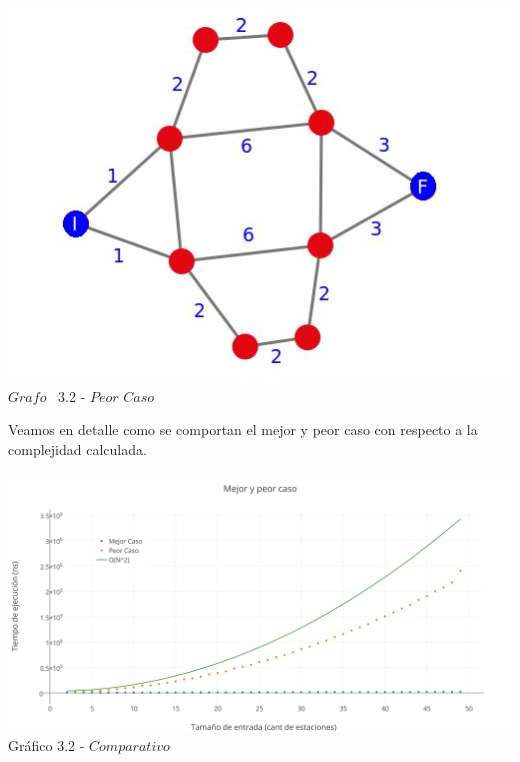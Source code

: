 \vspace*{0.3cm} \vspace*{0.3cm}
  \begin{center}
 \includegraphics[scale=0.5]{./EJ3/grafoMultiCamino.jpeg}
 \\{$Grafo$ \ 3.2 - $Peor$ $Caso$}
  \end{center}
  \vspace*{0.3cm}

Veamos en detalle como se comportan el mejor y peor caso con respecto a la complejidad calculada.\\

  \vspace*{0.3cm} \vspace*{0.3cm}
  \begin{center}
\includegraphics[scale=0.5]{./EJ3/mejorYpeorCaso.png}
{Gr\'afico 3.2 - $Comparativo$}
  \end{center}
  \vspace*{0.3cm}

